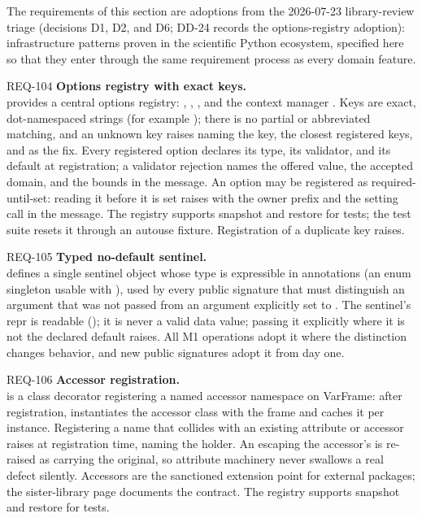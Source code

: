 The requirements of this section are adoptions from the 2026-07-23
library-review triage (decisions D1, D2, and D6; DD-24 records the
options-registry adoption): infrastructure patterns proven in the
scientific Python ecosystem, specified here so that they enter \itc{}
through the same requirement process as every domain feature.

\begin{reqbox}{REQ-104}{\draft}
\textbf{Options registry with exact keys.}\\
\itc{} provides a central options registry:
, ,
, and the context manager
. Keys are exact,
dot-namespaced strings (for example ); there is no
partial or abbreviated matching, and an unknown key raises
 naming the key, the closest registered keys, and
 as the fix. Every registered option declares
its type, its validator, and its default at registration; a validator
rejection names the offered value, the accepted domain, and the
bounds in the message. An option may be registered as
required-until-set: reading it before it is set raises with the owner prefix and the
setting call in the message. The registry supports snapshot and
restore for tests; the test suite resets it through an autouse
fixture. Registration of a duplicate key raises.
\end{reqbox}

\begin{reqbox}{REQ-105}{\draft}
\textbf{Typed no-default sentinel.}\\
\itc{} defines a single sentinel object  whose
type is expressible in annotations (an enum singleton usable with
), used by every public signature that must distinguish
an argument that was not passed from an argument explicitly set to
. The sentinel's repr is readable
(); it is never a valid data value; passing it
explicitly where it is not the declared default raises. All M1
operations adopt it where the distinction changes behavior, and new
public signatures adopt it from day one.
\end{reqbox}

\begin{reqbox}{REQ-106}{\draft}
\textbf{Accessor registration.}\\
 is a class decorator registering
a named accessor namespace on VarFrame: after registration,
 instantiates the accessor class with the frame and
caches it per instance. Registering a name that collides with an
existing attribute or accessor raises at registration time, naming
the holder. An  escaping the accessor's
 is re-raised as  carrying the
original, so attribute machinery never swallows a real defect
silently. Accessors are the sanctioned extension point for external
packages; the sister-library page documents the contract. The
registry supports snapshot and restore for tests.
\end{reqbox}
